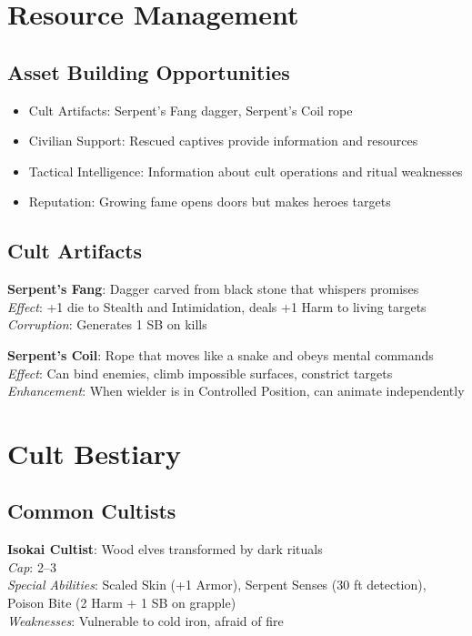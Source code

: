 \documentclass[11pt]{article}
\begin{document}
\section*{Resource Management}

\subsection*{Asset Building Opportunities}
\begin{itemize}
    \item Cult Artifacts: Serpent's Fang dagger, Serpent's Coil rope
    \item Civilian Support: Rescued captives provide information and resources
    \item Tactical Intelligence: Information about cult operations and ritual weaknesses
    \item Reputation: Growing fame opens doors but makes heroes targets
\end{itemize}

\subsection*{Cult Artifacts}
\textbf{Serpent's Fang}: Dagger carved from black stone that whispers promises\\
\textit{Effect}: +1 die to Stealth and Intimidation, deals +1 Harm to living targets\\
\textit{Corruption}: Generates 1 SB on kills

\textbf{Serpent's Coil}: Rope that moves like a snake and obeys mental commands\\
\textit{Effect}: Can bind enemies, climb impossible surfaces, constrict targets\\
\textit{Enhancement}: When wielder is in Controlled Position, can animate independently

\section*{Cult Bestiary}

\subsection*{Common Cultists}
\textbf{Isokai Cultist}: Wood elves transformed by dark rituals\\
\textit{Cap}: 2–3\\
\textit{Special Abilities}: Scaled Skin (+1 Armor), Serpent Senses (30 ft detection), Poison Bite (2 Harm + 1 SB on grapple)\\
\textit{Weaknesses}: Vulnerable to cold iron, afraid of fire
\end{document}
